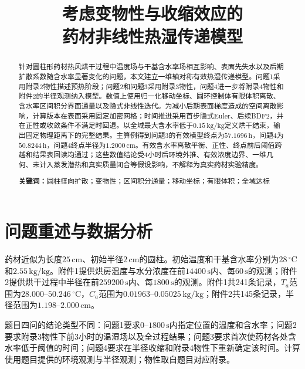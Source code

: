 \documentclass[UTF8,12pt,a4paper]{ctexart}
\title{考虑变物性与收缩效应的\\药材非线性热湿传递模型}
\author{}
\date{}
\newcommand{\keywords}[1]{\par\noindent\textbf{关键词：}#1}
\begin{document}
\pagestyle{plain}
\maketitle

\begin{abstract}
针对圆柱形药材热风烘干过程中温度场与干基含水率场相互影响、表面先失水以及后期扩散系数随含水率显著变化的问题，本文建立一维轴对称有效热湿传递模型。问题1采用附录2物性描述预热阶段；问题2和问题3采用附录3物性，问题4进一步将附录4物性和附件2的半径观测纳入模型。数值上使用归一化移动坐标、圆环控制体有限体积离散、含水率区间积分界面通量以及隐式非线性迭代。为减小后期表面梯度造成的空间离散影响，计算版本在表面采用固定加密网格；时间推进采用首步隐式Euler、后续BDF2，并在正性或收敛条件不满足时回退。以全域最大含水率低于$0.15\,\mathrm{kg/kg}$定义烘干结束，输出固定物理距离下的完整结果。主算例得到问题3的有效模型终点为$57.1696\,\mathrm h$，问题4为$50.8244\,\mathrm h$，问题4终点半径为$1.2000\,\mathrm{cm}$。有效含水率离散平衡、正性、终点前后阈值跨越和结果表回读均通过；这些数值结论受4小时后环境外推、有效浓度边界、一维几何、未计入蒸发潜热和真实质量闭合等假设影响，不解释为真实药材实验精度。

\keywords{圆柱径向扩散；变物性；区间积分通量；移动坐标；有限体积；全域达标}
\end{abstract}
\clearpage

\section{问题重述与数据分析}
药材近似为长度$25\,\mathrm{cm}$、初始半径$2\,\mathrm{cm}$的圆柱。初始温度和干基含水率分别为$28\,^{\circ}\mathrm C$和$2.55\,\mathrm{kg/kg}$。附件1提供烘房温度与水分浓度在前$14400\,\mathrm s$内、每$60\,\mathrm s$的观测；附件2提供烘干过程中半径在前$259200\,\mathrm s$内、每$1800\,\mathrm s$的观测。附件1共241条记录，$T_a$范围为$28.000$--$50.246\,^{\circ}\mathrm C$，$C_a$范围为$0.01963$--$0.05025\,\mathrm{kg/kg}$；附件2共145条记录，半径范围为$1.198$--$2.000\,\mathrm{cm}$。

题目四问的结论类型不同：问题1要求$0$--$1800\,\mathrm s$内指定位置的温度和含水率；问题2要求附录3物性下前3小时的温湿场以及全过程结果；问题3要求首次使药材各处含水率低于阈值的时间；问题4要求在半径收缩和附录4物性下重新确定该时间。计算使用题目提供的环境观测与半径观测；物性取自题目对应附录。
\end{document}
